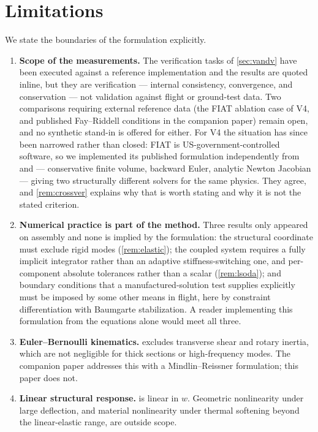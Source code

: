 \documentclass[11pt,a4paper]{article}
\theoremstyle{definition}
\numberwithin{equation}{section}
\begin{document}
\section{Limitations}
\label{sec:limitations}

We state the boundaries of the formulation explicitly.

\begin{enumerate}
    \item \textbf{Scope of the measurements.} The verification tasks of \cref{sec:vandv} have been executed against a reference implementation and the results are quoted inline, but they are verification --- internal consistency, convergence, and conservation --- not validation against flight or ground-test data. Two comparisons requiring external reference data (the FIAT ablation case of V4, and published Fay--Riddell conditions in the companion paper) remain open, and no synthetic stand-in is offered for either. For V4 the situation has since been narrowed rather than closed: FIAT is US-government-controlled software, so we implemented its published formulation independently from \cite{chen1999} and \cite{milos2006} --- conservative finite volume, backward Euler, analytic Newton Jacobian --- giving two structurally different solvers for the same physics. They agree, and \cref{rem:crossver} explains why that is worth stating and why it is not the stated criterion.

    \item \textbf{Numerical practice is part of the method.} Three results only appeared on assembly and none is implied by the formulation: the structural coordinate must exclude rigid modes (\cref{rem:elastic}); the coupled system requires a fully implicit integrator rather than an adaptive stiffness-switching one, and per-component absolute tolerances rather than a scalar (\cref{rem:lsoda}); and boundary conditions that a manufactured-solution test supplies explicitly must be imposed by some other means in flight, here by constraint differentiation with Baumgarte stabilization. A reader implementing this formulation from the equations alone would meet all three.

    \item \textbf{Euler--Bernoulli kinematics.}  excludes transverse shear and rotary inertia, which are not negligible for thick sections or high-frequency modes. The companion paper \cite{knox2026hgv} addresses this with a Mindlin--Reissner formulation; this paper does not.

    \item \textbf{Linear structural response.}  is linear in $w$. Geometric nonlinearity under large deflection, and material nonlinearity under thermal softening beyond the linear-elastic range, are outside scope.


\end{enumerate}
\end{document}
